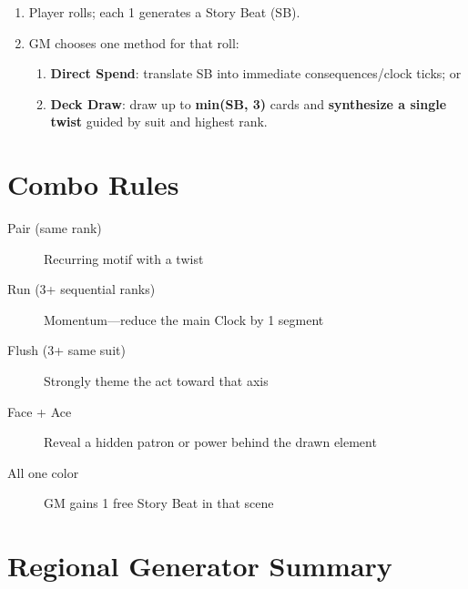 \begin{enumerate}
  \item Player rolls; each 1 generates a Story Beat (SB).
  \item GM chooses one method for that roll:
  \begin{enumerate}
    \item \textbf{Direct Spend}: translate SB into immediate consequences/clock ticks; or
    \item \textbf{Deck Draw}: draw up to \textbf{min(SB, 3)} cards and \textbf{synthesize a single twist}
    guided by suit and highest rank.
  \end{enumerate}
\end{enumerate}

\section{Combo Rules}

\begin{description}
\item[Pair (same rank)] Recurring motif with a twist
\item[Run (3+ sequential ranks)] Momentum---reduce the main Clock by 1 segment
\item[Flush (3+ same suit)] Strongly theme the act toward that axis
\item[Face + Ace] Reveal a hidden patron or power behind the drawn element
\item[All one color] GM gains 1 free Story Beat in that scene
\end{description}

\section{Regional Generator Summary}


